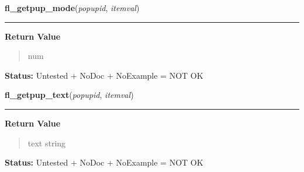     \vspace{0.5ex}

\hspace{.8\funcindent}\begin{boxedminipage}{\funcwidth}

    \raggedright \textbf{fl\_getpup\_mode}(\textit{popupid}, \textit{itemval})

    \vspace{-1.5ex}

    \rule{\textwidth}{0.5\fboxrule}
\setlength{\parskip}{2ex}
\setlength{\parskip}{1ex}
      \textbf{Return Value}
    \vspace{-1ex}

      \begin{quote}
      num

      \end{quote}

\textbf{Status:} Untested + NoDoc + NoExample = NOT OK



    \end{boxedminipage}

    \label{xformslib:library:fl_getpup_text}

    \vspace{0.5ex}

\hspace{.8\funcindent}\begin{boxedminipage}{\funcwidth}

    \raggedright \textbf{fl\_getpup\_text}(\textit{popupid}, \textit{itemval})

    \vspace{-1.5ex}

    \rule{\textwidth}{0.5\fboxrule}
\setlength{\parskip}{2ex}
\setlength{\parskip}{1ex}
      \textbf{Return Value}
    \vspace{-1ex}

      \begin{quote}
      text string

      \end{quote}

\textbf{Status:} Untested + NoDoc + NoExample = NOT OK



    \end{boxedminipage}

    \label{xformslib:library:fl_showpup}

